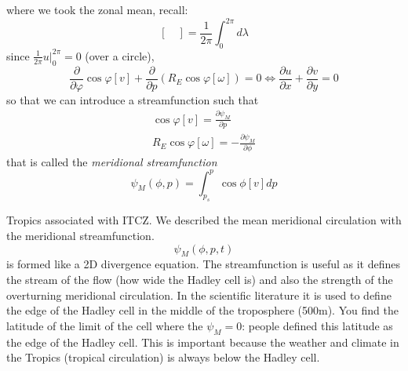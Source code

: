 where we took the zonal mean, recall:
\[\left[\quad\right]=\frac{1}{2\pi}\int_0^{2\pi}d\lambda\]
since $\displaystyle \frac{1}{2\pi} u\big|_0^{2\pi}=0$ (over a circle), 
\[\frac{\partial}{\partial\varphi}\cos\varphi[v]+\frac{\partial}{\partial p}\left(R_E\cos\varphi[\omega]\right)=0\Leftrightarrow \frac{\partial u}{\partial x}+\frac{\partial v}{\partial y}=0\]
so that we can introduce a streamfunction such that 
\begin{align*}
    \cos\varphi[v]=\frac{\partial\psi_M}{\partial p}\\
    R_E\cos\varphi[\omega]=-\frac{\partial\psi_M}{\partial\phi}
\end{align*}
that is called the \emph{meridional streamfunction}
\begin{equation}\label{eq.meridional streamfunction}
    \psi_M(\phi,p)=\int_{p_s}^p\cos\phi[v]dp
\end{equation}

Tropics associated with ITCZ. 
We described the mean meridional circulation with the meridional streamfunction. 
$$\psi_M(\phi,p,t)$$ is formed like a 2D divergence equation. The streamfunction is useful as it defines the stream of the flow (how wide the Hadley cell is) and also the strength of the overturning meridional circulation. In the scientific literature it is used to define the edge of the Hadley cell in the middle of the troposphere (500m). You find the latitude of the limit of the cell where the $\psi_M=0$: people defined this latitude as the edge of the Hadley cell. This is important because the weather and climate in the Tropics (tropical circulation) is always below the Hadley cell. 




